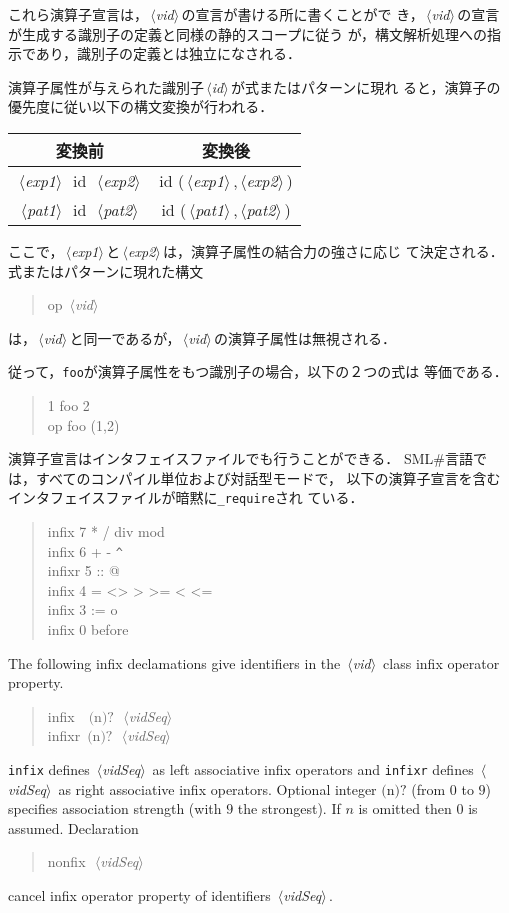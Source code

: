 \documentclass{jbook}
\newcommand{\smlsharp}{SML\#}
\newcommand{\code}[1]{\mbox{\large\tt #1}}
\newcommand{\nonterm}[1]{\mbox{$\,\langle$}{\it #1}\mbox{$\rangle\,$}}
\newcommand{\optional}[1]{\mbox{$($}{\protect #1}\mbox{$)?$}}
\newenvironment{program}{\begin{quote}\begin{tt}}%
                        {\end{tt}\end{quote}}
\begin{document}
	これら演算子宣言は，\nonterm{vid}の宣言が書ける所に書くことがで
き，\nonterm{vid}の宣言が生成する識別子の定義と同様の静的スコープに従う
が，構文解析処理への指示であり，識別子の定義とは独立になされる．

	演算子属性が与えられた識別子\nonterm{id}が式またはパターンに現れ
ると，演算子の優先度に従い以下の構文変換が行われる．

\begin{tabular}{|c|c|}
\hline
変換前 & 変換後
\\\hline
\nonterm{exp1}\ id\ \nonterm{exp2} & id (\nonterm{exp1},\nonterm{exp2})
\\\hline
\nonterm{pat1}\ id\ \nonterm{pat2} & id (\nonterm{pat1},\nonterm{pat2})	
\\\hline
\end{tabular}

ここで，\nonterm{exp1}と\nonterm{exp2}は，演算子属性の結合力の強さに応じ
て決定される．
	式またはパターンに現れた構文
\begin{program}
op \nonterm{vid}
\end{program}
は，\nonterm{vid}と同一であるが，\nonterm{vid}の演算子属性は無視される．

	従って，\code{foo}が演算子属性をもつ識別子の場合，以下の２つの式は
等価である．
\begin{program}
1 foo 2\\
op foo (1,2)
\end{program}

	演算子宣言はインタフェイスファイルでも行うことができる．
	\smlsharp{}言語では，すべてのコンパイル単位および対話型モードで，
以下の演算子宣言を含むインタフェイスファイルが暗黙に\code{\_require}され
ている．
\begin{program}
  infix  7 * / div mod\\
  infix  6 + - \verb|^|\\
  infixr 5 :: @\\
  infix  4 = <> > >= < <=\\
  infix  3 := o\\
  infix  0 before
\end{program}
\else%

	The following infix declamations give identifiers in 
the \nonterm{vid} class infix operator property.
\begin{program}
infix\ \ \optional{n}\ \nonterm{vidSeq}\\
infixr\ \optional{n}\ \nonterm{vidSeq}
\end{program}
	\code{infix} defines \nonterm{vidSeq} as left associative infix
operators and \code{infixr} defines \nonterm{vidSeq} as right associative
infix operators.
	Optional integer \optional{n} (from $0$ to $9$) specifies
association strength (with $9$ the strongest).
	If $n$ is omitted then $0$ is assumed.
	Declaration
\begin{program}
nonfix\ \nonterm{vidSeq} 
\end{program}
cancel infix operator property of identifiers \nonterm{vidSeq}.
\end{document}
